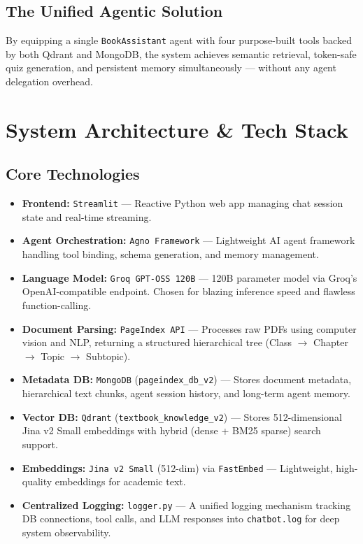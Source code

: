 \documentclass[12pt, a4paper]{article}
\begin{document}
\subsection{The Unified Agentic Solution}
By equipping a single \texttt{BookAssistant} agent with four purpose-built tools backed by both Qdrant and MongoDB, the system achieves semantic retrieval, token-safe quiz generation, and persistent memory simultaneously — without any agent delegation overhead.

\newpage
\section{System Architecture \& Tech Stack}

\subsection{Core Technologies}
\begin{itemize}
    \item \textbf{Frontend:} \texttt{Streamlit} — Reactive Python web app managing chat session state and real-time streaming.
    \item \textbf{Agent Orchestration:} \texttt{Agno Framework} — Lightweight AI agent framework handling tool binding, schema generation, and memory management.
    \item \textbf{Language Model:} \texttt{Groq GPT-OSS 120B} — 120B parameter model via Groq's OpenAI-compatible endpoint. Chosen for blazing inference speed and flawless function-calling.
    \item \textbf{Document Parsing:} \texttt{PageIndex API} — Processes raw PDFs using computer vision and NLP, returning a structured hierarchical tree (Class $\rightarrow$ Chapter $\rightarrow$ Topic $\rightarrow$ Subtopic).
    \item \textbf{Metadata DB:} \texttt{MongoDB} (\texttt{pageindex\_db\_v2}) — Stores document metadata, hierarchical text chunks, agent session history, and long-term agent memory.
    \item \textbf{Vector DB:} \texttt{Qdrant} (\texttt{textbook\_knowledge\_v2}) — Stores 512-dimensional Jina v2 Small embeddings with hybrid (dense + BM25 sparse) search support.
    \item \textbf{Embeddings:} \texttt{Jina v2 Small} (512-dim) via \texttt{FastEmbed} — Lightweight, high-quality embeddings for academic text.
    \item \textbf{Centralized Logging:} \texttt{logger.py} — A unified logging mechanism tracking DB connections, tool calls, and LLM responses into \texttt{chatbot.log} for deep system observability.
\end{itemize}
\end{document}

